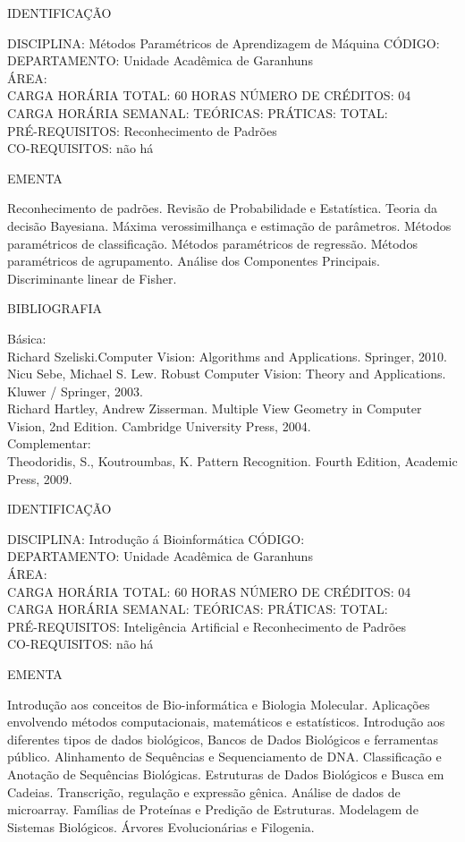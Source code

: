 \documentclass[
	12pt,				%
	openright,			%
  oneside,     %
	a4paper,			%
	english,			%
	french,				%
	spanish,			%
	brazil				%
	]{abntex2}
\begin{document}
\begin{apendicesenv}
\newpage IDENTIFICAÇÃO

DISCIPLINA: Métodos Paramétricos de Aprendizagem de Máquina CÓDIGO:\\ 
DEPARTAMENTO: Unidade Acadêmica de Garanhuns\\
ÁREA: \\
CARGA HORÁRIA TOTAL: 60 HORAS NÚMERO DE CRÉDITOS: 04\\
CARGA HORÁRIA SEMANAL: TEÓRICAS: PRÁTICAS: TOTAL: \\
PRÉ-REQUISITOS: Reconhecimento de Padrões\\
CO-REQUISITOS: não há

EMENTA 

Reconhecimento de padrões. Revisão de Probabilidade e Estatística. Teoria da decisão Bayesiana. Máxima verossimilhança e estimação de parâmetros. Métodos paramétricos de classificação. Métodos paramétricos de regressão. Métodos paramétricos de agrupamento. Análise dos Componentes Principais. Discriminante linear de Fisher.

BIBLIOGRAFIA 

Básica:\\
Richard Szeliski.Computer Vision: Algorithms and Applications. Springer,
2010.\\
Nicu Sebe, Michael S. Lew. Robust Computer Vision: Theory and
Applications. Kluwer / Springer, 2003.\\
Richard Hartley, Andrew Zisserman. Multiple View Geometry in Computer
Vision, 2nd Edition. Cambridge University Press, 2004.\\
Complementar:\\
Theodoridis, S., Koutroumbas, K. Pattern Recognition. Fourth Edition,
Academic Press, 2009.

\newpage IDENTIFICAÇÃO

DISCIPLINA: Introdução á Bioinformática CÓDIGO:\\ 
DEPARTAMENTO: Unidade Acadêmica de Garanhuns\\
ÁREA: \\
CARGA HORÁRIA TOTAL: 60 HORAS NÚMERO DE CRÉDITOS: 04\\
CARGA HORÁRIA SEMANAL: TEÓRICAS: PRÁTICAS: TOTAL: \\
PRÉ-REQUISITOS: Inteligência Artificial e Reconhecimento de Padrões\\
CO-REQUISITOS: não há

EMENTA 

Introdução aos conceitos de Bio-informática e Biologia Molecular.
Aplicações envolvendo métodos computacionais, matemáticos e
estatísticos. Introdução aos diferentes tipos de dados biológicos,
Bancos de Dados Biológicos e ferramentas público. Alinhamento de
Sequências e Sequenciamento de DNA. Classificação e Anotação de
Sequências Biológicas. Estruturas de Dados Biológicos e Busca em
Cadeias. Transcrição, regulação e expressão gênica. Análise de dados de
microarray. Famílias de Proteínas e Predição de Estruturas. Modelagem
de Sistemas Biológicos. Árvores Evolucionárias e Filogenia.


\end{apendicesenv}
\end{document}
